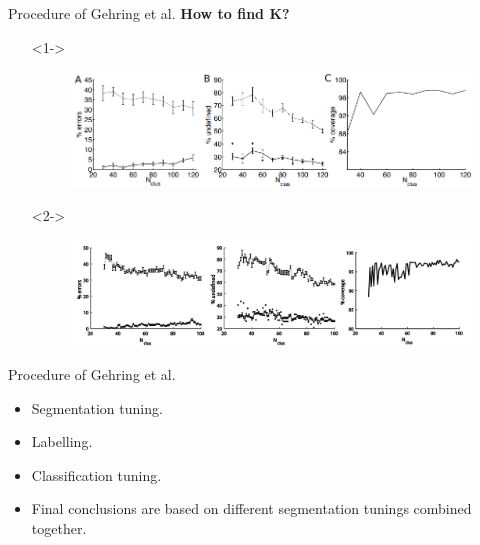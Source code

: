 \documentclass{beamer}
\newlength{\tmpShadow}
\newcommand{\MyShadow}[2]{%
	\settowidth{\tmpShadow}{#1}
	\addtolength{\tmpShadow}{.1em}
	\raisebox{-0.25ex}{\textcolor{gray!70}{#1}}%
	\kern-\tmpShadow%
	\textcolor{#2}{#1}%
}
\begin{document}
{\begin{frame}{Procedure of Gehring et al.}
	\textbf{How to find K?}	
	\vspace{3mm}
	\begin{itemize}[leftmargin=-2mm]
		\setlength{\itemindent}{0em}
		\item[]<1->
		\begin{figure}[H]
			\centering
			\includegraphics[width=\textwidth]{figures/kvalidation}
		\end{figure}
		\item[]<2->	
		\begin{figure}[H]
			\centering
			\includegraphics[width=\textwidth]{figures/kvalidationC}
		\end{figure}
	\end{itemize}
\end{frame}

\begin{frame}{Procedure of Gehring et al.}
	\begin{itemize}[label={\MyShadow{$\bullet$}{blue!80}}]
		\item Segmentation tuning.
		\vspace{3mm}
		\item Labelling.
		\vspace{3mm}
		\item Classification tuning.	
		\vspace{3mm}
		\item Final conclusions are based on different segmentation tunings combined together.		
	\end{itemize}
\end{frame}


}
\end{document}
